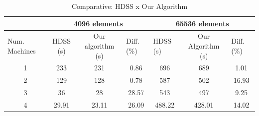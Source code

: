 \documentclass[journal]{IEEEtran}
\begin{document}
\begin{table}[htb]
\centering
\caption{Comparative: HDSS x Our Algorithm}
\begin{scriptsize}
\begin{tabular}{c|c|c|c|c|c|c|}
\cline{2-7}
\multicolumn{1}{l|}{}                 & \multicolumn{3}{c|}{4096 elements}                              & \multicolumn{3}{c|}{65536 elements}                                                  \\ \hline
\multicolumn{1}{|l|}{Num. Machines} & HDSS (s) & Our algorithm (s) & \multicolumn{1}{l|}{Diff. (\%)} & \multicolumn{1}{l|}{HDSS (s)} & Our Algorithm (s) & \multicolumn{1}{l|}{Diff. (\%)} \\ \hline
\multicolumn{1}{|c|}{1 }       & 233     & 231              &   0.86                        
			 & 696                          &   689             &    1.01                        \\ \hline
\multicolumn{1}{|c|}{2 }      & 129     & 128              &    0.78                         
				& 587                         & 502             & 16.93                     \\ \hline
\multicolumn{1}{|c|}{3 }      & 36     & 28              & 28.57                            
			&          543                &    497           &      9.25                          \\ \hline
\multicolumn{1}{|c|}{4 }      & 29.91     & 23.11            & 26.09                       
			    & 488.22                          & 428.01              &     14.02            \\ \hline
\end{tabular}
\end{scriptsize}
\label{table: comparativo}
\end{table}
\end{document}
